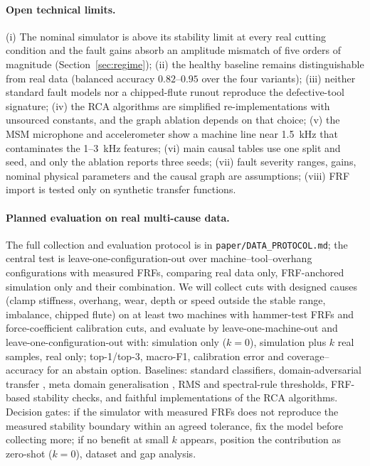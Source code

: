 \documentclass[11pt]{article}
\begin{document}
\paragraph{Open technical limits.} (i) The nominal simulator is above its stability limit at every real cutting condition and the fault gains absorb an amplitude mismatch of five orders of magnitude (Section~\ref{sec:regime}); (ii) the healthy baseline remains distinguishable from real data (balanced accuracy $0.82$--$0.95$ over the four variants); (iii) neither standard fault models nor a chipped-flute runout reproduce the defective-tool signature; (iv) the RCA algorithms are simplified re-implementations with unsourced constants, and the graph ablation depends on that choice; (v) the MSM microphone and accelerometer show a machine line near 1.5~kHz that contaminates the 1--3~kHz features; (vi) main causal tables use one split and seed, and only the ablation reports three seeds; (vii) fault severity ranges, gains, nominal physical parameters and the causal graph are assumptions; (viii) FRF import is tested only on synthetic transfer functions.
\paragraph{Planned evaluation on real multi-cause data.} The full collection and evaluation protocol is in \texttt{paper/DATA\_PROTOCOL.md}; the central test is leave-one-configuration-out over machine--tool--overhang configurations with measured FRFs, comparing real data only, FRF-anchored simulation only and their combination. We will collect cuts with designed causes (clamp stiffness, overhang, wear, depth or speed outside the stable range, imbalance, chipped flute) on at least two machines with hammer-test FRFs and force-coefficient calibration cuts, and evaluate by leave-one-machine-out and leave-one-configuration-out with: simulation only ($k{=}0$), simulation plus $k$ real samples, real only; top-1/top-3, macro-F1, calibration error and coverage--accuracy for an abstain option. Baselines: standard classifiers, domain-adversarial transfer \citep{wang2020datwear}, meta domain generalisation \citep{li2023metadg}, RMS and spectral-rule thresholds, FRF-based stability checks, and faithful implementations of the RCA algorithms. Decision gates: if the simulator with measured FRFs does not reproduce the measured stability boundary within an agreed tolerance, fix the model before collecting more; if no benefit at small $k$ appears, position the contribution as zero-shot ($k{=}0$), dataset and gap analysis.
\end{document}
